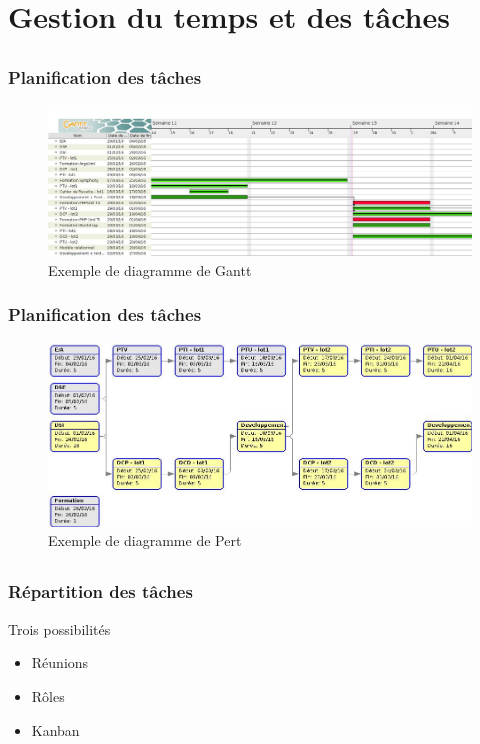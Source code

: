\documentclass[compress,xcolor=dvipsnames]{beamer}
\begin{document}
\section{Gestion du temps et des tâches}
\subsection{}
\begin{frame}
\frametitle{Planification des tâches}
\begin{figure}
\begin{center}
\includegraphics[scale=0.2]{images/exempleGantt.jpg}
\caption{Exemple de diagramme de Gantt}
\label{DG}
\end{center}
\end{figure}
\end{frame}

\begin{frame}
\frametitle{Planification des tâches}
\begin{figure}
\begin{center}
\includegraphics[scale=0.3]{images/exemplePert.jpg}
\caption{Exemple de diagramme de Pert}
\label{DP}
\end{center}
\end{figure}
\end{frame}


\subsection{}
\begin{frame}
\frametitle{Répartition des tâches}
\begin{block}{Trois possibilités}
\begin{itemize}
	\item Réunions
	\item Rôles
	\item Kanban
\end{itemize}
\end{block}
\end{frame}
\end{document}
